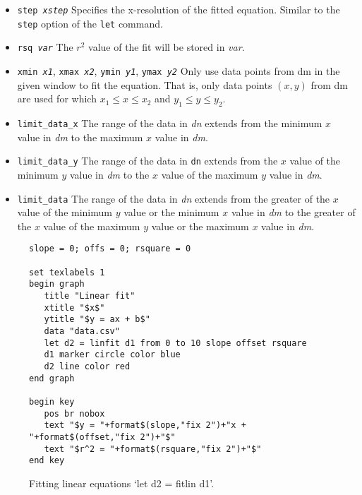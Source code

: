 \begin{commanddescription}
\begin{itemize}
\item \texttt{step {\it xstep}} Specifies the x-resolution of the fitted equation. Similar to the \texttt{step} option of the \texttt{let} command.

\item \texttt{rsq {\it var}} The $r^2$ value of the fit will be stored in {\it var}.

\item \texttt{xmin {\it x1}}, \texttt{xmax {\it x2}}, \texttt{ymin {\it y1}}, \texttt{ymax {\it y2}} Only use data points from dm in the given window to fit the equation. That is, only data points $(x,y)$ from dm are used for which $x_1 \le x \le x_2$ and $y_1 \le y \le y_2$.

\item \texttt{limit\_data\_x} The range of the data in \textit{dn} extends from the minimum $x$ value in \textit{dm} to the maximum $x$ value in \textit{dm}.

\item \texttt{limit\_data\_y} The range of the data in \texttt{dn} extends from the $x$ value of the minimum $y$ value in \textit{dm} to the $x$ value of the maximum $y$ value in \textit{dm}.

\item \texttt{limit\_data} The range of the data in \textit{dn} extends from the greater of the $x$ value of the minimum $y$ value or the minimum $x$ value in \textit{dm} to the greater of the $x$ value of the maximum $y$ value or the maximum $x$ value in \textit{dm}.
\end{itemize}

\begin{figure}[tb]
\begin{minipage}[c]{9.2cm}
\begin{Verbatim}
slope = 0; offs = 0; rsquare = 0

set texlabels 1
begin graph
   title "Linear fit"
   xtitle "$x$"
   ytitle "$y = ax + b$"
   data "data.csv"
   let d2 = linfit d1 from 0 to 10 slope offset rsquare
   d1 marker circle color blue
   d2 line color red
end graph

begin key
   pos br nobox
   text "$y = "+format$(slope,"fix 2")+"x + "+format$(offset,"fix 2")+"$"
   text "$r^2 = "+format$(rsquare,"fix 2")+"$"
end key
\end{Verbatim}
\end{minipage}
\hfill
\begin{minipage}[c]{7cm}
\mbox{}
\end{minipage}
\caption{\label{fig:fitlin}Fitting linear equations `let d2 = fitlin d1'.}
\end{figure}


\end{commanddescription}
